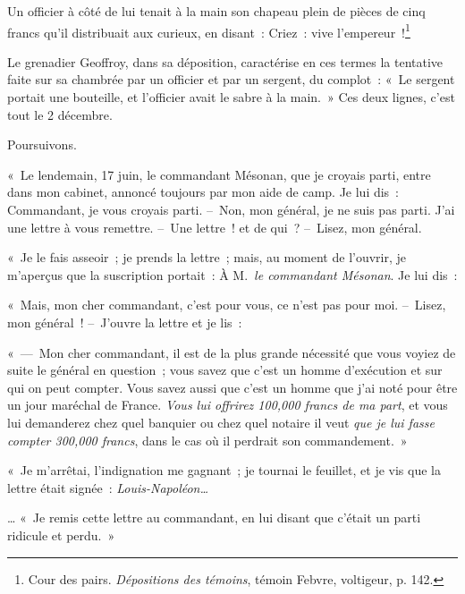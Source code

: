 \documentclass[french,twoside]{book} %
\newenvironment{quoteblock}%
  {\begin{quoting}}
  {\end{quoting}}
\newenvironment{quotebar}{%
    \def\FrameCommand{{\color{rubric!10!}\vrule width 0.5em} \hspace{0.9em}}%
    \def\OuterFrameSep{\itemsep} %
    \MakeFramed {\advance\hsize-\width \FrameRestore}
  }%
  {%
    \endMakeFramed
  }
\renewenvironment{quoteblock}%
  {%
    \savenotes
    \setstretch{0.9}
    \normalfont
    \begin{quotebar}
  }
  {%
    \end{quotebar}
    \spewnotes
  }
\begin{document}
Un officier à côté de lui tenait à la main son chapeau plein de pièces de cinq francs qu’il distribuait aux curieux, en disant : Criez : vive l’empereur !\footnote{Cour des pairs. \emph{Dépositions des témoins}, témoin Febvre, voltigeur, p. 142.}\par
Le grenadier Geoffroy, dans sa déposition, caractérise en ces termes la tentative faite sur sa chambrée par un officier et par un sergent, du complot : « Le sergent portait une bouteille, et l’officier avait le sabre à la main. » Ces deux lignes, c’est tout le 2 décembre.\par
Poursuivons.\par

\begin{quoteblock}
 \noindent « Le lendemain, 17 juin, le commandant Mésonan, que je croyais parti, entre dans mon cabinet, annoncé toujours par mon aide de camp. Je lui dis : Commandant, je vous croyais parti. – Non, mon général, je ne suis pas parti. J’ai une lettre à vous remettre. – Une lettre ! et de qui ? – Lisez, mon général.\par
 « Je le fais asseoir ; je prends la lettre ; mais, au moment de l’ouvrir, je m’aperçus que la suscription portait : À M. \emph{le commandant Mésonan}. Je lui dis :\par
 « Mais, mon cher commandant, c’est pour vous, ce n’est pas pour moi. – Lisez, mon général ! – J’ouvre la lettre et je lis :\par
 « — Mon cher commandant, il est de la plus grande nécessité que vous voyiez de suite le général en question ; vous savez que c’est un homme d’exécution et sur qui on peut compter. Vous savez aussi que c’est un homme que j’ai noté pour être un jour maréchal de France. \emph{Vous lui offrirez 100,000 francs de ma part}, et vous lui demanderez chez quel banquier ou chez quel notaire il veut \emph{que je lui fasse compter 300,000 francs}, dans le cas où il perdrait son commandement. »\par
 « Je m’arrêtai, l’indignation me gagnant ; je tournai le feuillet, et je vis que la lettre était signée : \emph{Louis-Napoléon…}\par
 … « Je remis cette lettre au commandant, en lui disant que c’était un parti ridicule et perdu. »
 \end{quoteblock}
\end{document}
